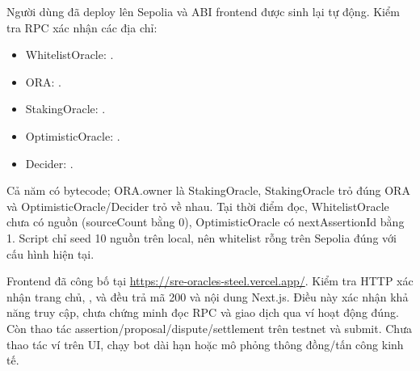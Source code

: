 Người dùng đã deploy lên Sepolia và ABI frontend được sinh lại tự động. Kiểm tra RPC xác nhận các địa chỉ:
\begin{itemize}
    \item WhitelistOracle: .
    \item ORA: .
    \item StakingOracle: .
    \item OptimisticOracle: .
    \item Decider: .
\end{itemize}
Cả năm có bytecode; ORA.owner là StakingOracle, StakingOracle trỏ đúng ORA và OptimisticOracle/Decider trỏ về nhau. Tại thời điểm đọc, WhitelistOracle chưa có nguồn (sourceCount bằng 0), OptimisticOracle có nextAssertionId bằng 1. Script chỉ seed 10 nguồn trên local, nên whitelist rỗng trên Sepolia đúng với cấu hình hiện tại.

Frontend đã công bố tại \url{https://sre-oracles-steel.vercel.app/}. Kiểm tra HTTP xác nhận trang chủ, ,  và  đều trả mã 200 và nội dung Next.js. Điều này xác nhận khả năng truy cập, chưa chứng minh đọc RPC và giao dịch qua ví hoạt động đúng. Còn thao tác assertion/proposal/dispute/settlement trên testnet và submit. Chưa thao tác ví trên UI, chạy bot dài hạn hoặc mô phỏng thông đồng/tấn công kinh tế.
